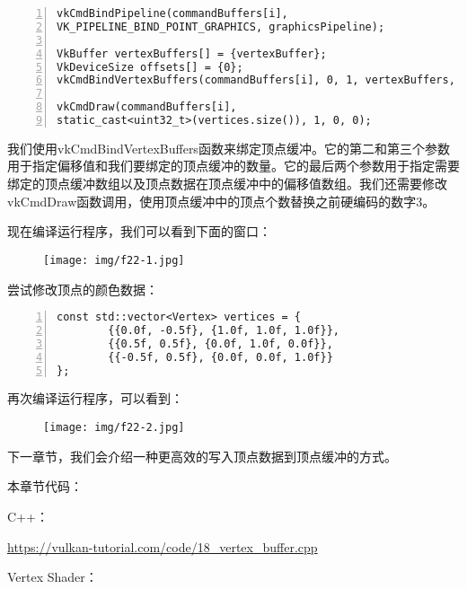 \documentclass{ctexart}
\begin{document}
\begin{lstlisting}[language={[ANSI]C},keywordstyle=\color{blue!70},commentstyle=\color{red!50!green!50!blue!50},frame=shadowbox, rulesepcolor=\color{red!20!green!20!blue!20},basicstyle=\small,numbers=left, numberstyle=\tiny,breaklines=true]
vkCmdBindPipeline(commandBuffers[i],
VK_PIPELINE_BIND_POINT_GRAPHICS, graphicsPipeline);

VkBuffer vertexBuffers[] = {vertexBuffer};
VkDeviceSize offsets[] = {0};
vkCmdBindVertexBuffers(commandBuffers[i], 0, 1, vertexBuffers, offsets);

vkCmdDraw(commandBuffers[i],
static_cast<uint32_t>(vertices.size()), 1, 0, 0);
\end{lstlisting}

我们使用vkCmdBindVertexBuffers函数来绑定顶点缓冲。它的第二和第三个参数用于指定偏移值和我们要绑定的顶点缓冲的数量。它的最后两个参数用于指定需要绑定的顶点缓冲数组以及顶点数据在顶点缓冲中的偏移值数组。我们还需要修改vkCmdDraw函数调用，使用顶点缓冲中的顶点个数替换之前硬编码的数字3。

现在编译运行程序，我们可以看到下面的窗口：

\begin{figure}[H]
	\centering
	\texttt{[image: img/f22-1.jpg]}
\end{figure}

尝试修改顶点的颜色数据：

\begin{lstlisting}[language={[ANSI]C},keywordstyle=\color{blue!70},commentstyle=\color{red!50!green!50!blue!50},frame=shadowbox, rulesepcolor=\color{red!20!green!20!blue!20},basicstyle=\small,numbers=left, numberstyle=\tiny,breaklines=true]
const std::vector<Vertex> vertices = {
		{{0.0f, -0.5f}, {1.0f, 1.0f, 1.0f}},
		{{0.5f, 0.5f}, {0.0f, 1.0f, 0.0f}},
		{{-0.5f, 0.5f}, {0.0f, 0.0f, 1.0f}}
};
\end{lstlisting}

再次编译运行程序，可以看到：

\begin{figure}[H]
	\centering
	\texttt{[image: img/f22-2.jpg]}
\end{figure}

下一章节，我们会介绍一种更高效的写入顶点数据到顶点缓冲的方式。

本章节代码：

C++：

\url{https://vulkan-tutorial.com/code/18_vertex_buffer.cpp}

Vertex Shader：
\end{document}
